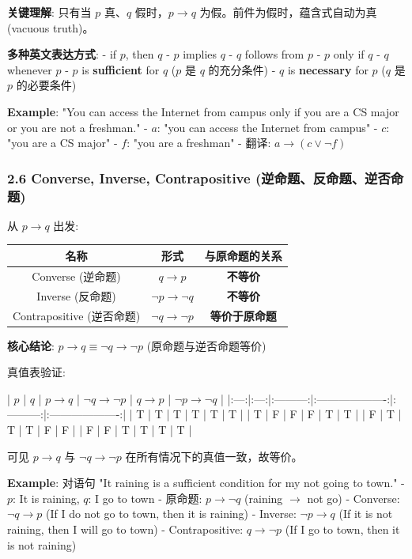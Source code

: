 \documentclass[10pt,a4paper,openany]{ctexbook}
\theoremstyle{definition}
\theoremstyle{remark}
\renewenvironment{quote}
  {\list{}{\leftmargin=1em\rightmargin=0pt\topsep=0.5pt\partopsep=0pt}\item[]}
  {\endlist}
\begin{document}
\begin{quote}
\textbf{关键理解}: 只有当 $p$ 真、$q$ 假时，$p \to q$ 为假。前件为假时，蕴含式自动为真 (vacuous truth)。

\textbf{多种英文表达方式}:
- if $p$, then $q$
- $p$ implies $q$
- $q$ follows from $p$
- $p$ only if $q$
- $q$ whenever $p$
- $p$ is \textbf{sufficient} for $q$ ($p$ 是 $q$ 的充分条件)
- $q$ is \textbf{necessary} for $p$ ($q$ 是 $p$ 的必要条件)

\textbf{Example}: "You can access the Internet from campus only if you are a CS major or you are not a freshman."
- $a$: "you can access the Internet from campus"
- $c$: "you are a CS major"
- $f$: "you are a freshman"
- 翻译: $a \to (c \lor \neg f)$

\end{quote}
\vspace{-2pt}

\subsubsection{2.6 Converse, Inverse, Contrapositive (逆命题、反命题、逆否命题)}

从 $p \to q$ 出发:
\begin{center}
\begin{tabular}{ccc}
\hline
名称 & 形式 & 与原命题的关系 \\ \hline
Converse (逆命题) & $q \to p$ & \textbf{不等价} \\
Inverse (反命题) & $\neg p \to \neg q$ & \textbf{不等价} \\
Contrapositive (逆否命题) & $\neg q \to \neg p$ & \textbf{等价于原命题} \\
\hline
\end{tabular}

\end{center}

\begin{quote}
\textbf{核心结论}: $p \to q \equiv \neg q \to \neg p$ (原命题与逆否命题等价)

真值表验证:

| $p$ | $q$ | $p \to q$ | $\neg q \to \neg p$ | $q \to p$ | $\neg p \to \neg q$ |
|:---:|:---:|:---------:|:-------------------:|:---------:|:-------------------:|
| T | T | T | T | T | T |
| T | F | F | F | T | T |
| F | T | T | T | F | F |
| F | F | T | T | T | T |

可见 $p \to q$ 与 $\neg q \to \neg p$ 在所有情况下的真值一致，故等价。

\textbf{Example}: 对语句 "It raining is a sufficient condition for my not going to town."
- $p$: It is raining, $q$: I go to town
- 原命题: $p \to \neg q$ (raining $\to$ not go)
- Converse: $\neg q \to p$ (If I do not go to town, then it is raining)
- Inverse: $\neg p \to q$ (If it is not raining, then I will go to town)
- Contrapositive: $q \to \neg p$ (If I go to town, then it is not raining)

\end{quote}
\vspace{-2pt}
\end{document}
